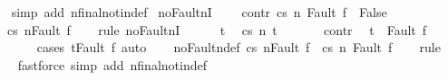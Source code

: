 \begin{isabellebody}
%
\isadelimproof
\ \ %
\endisadelimproof
%
\isatagproof
{}\isamarkupfalse%
\ {\isacharparenleft}simp\ add{\isacharcolon}\ nfinal{\isacharunderscore}notin{\isacharunderscore}def{\isacharparenright}%
\endisatagproof
{\isafoldproof}%
%
\isadelimproof
\isanewline
%
\endisadelimproof
\isanewline
{}\isamarkupfalse%
\ noFaultnI{\isacharprime}{\isacharcolon}\ \isanewline
\ \ \ contr{\isacharcolon}\ {\isachardoublequoteopen}{\isasymGamma}{\isasymturnstile}{\isasymlangle}c{\isacharcomma}s{\isasymrangle}\ {\isacharequal}n{\isasymRightarrow}\ Fault\ f\ {\isasymLongrightarrow}\ False{\isachardoublequoteclose}\isanewline
\ \ \ {\isachardoublequoteopen}{\isasymGamma}{\isasymturnstile}{\isasymlangle}c{\isacharcomma}s{\isasymrangle}\ {\isacharequal}n{\isasymRightarrow}{\isasymnotin}{\isacharbraceleft}Fault\ f{\isacharbraceright}{\isachardoublequoteclose}\isanewline
%
\isadelimproof
\ \ %
\endisadelimproof
%
\isatagproof
{}\isamarkupfalse%
\ {\isacharparenleft}rule\ noFaultnI{\isacharparenright}\isanewline
\ \ \ \ \isamarkupfalse%
\ t\ \isamarkupfalse%
\ {\isachardoublequoteopen}{\isasymGamma}{\isasymturnstile}{\isasymlangle}c{\isacharcomma}s{\isasymrangle}\ {\isacharequal}n{\isasymRightarrow}\ t{\isachardoublequoteclose}\ \isanewline
\ \ \ \ \isamarkupfalse%
\ contr\ \isamarkupfalse%
\ {\isachardoublequoteopen}t\ {\isasymnoteq}\ Fault\ f{\isachardoublequoteclose}\isanewline
\ \ \ \ \ \ \isamarkupfalse%
\ {\isacharparenleft}cases\ {\isachardoublequoteopen}t{\isacharequal}Fault\ f{\isachardoublequoteclose}{\isacharparenright}\ auto\isanewline
\ \ \isamarkupfalse%
%
\endisatagproof
{\isafoldproof}%
%
\isadelimproof
\isanewline
%
\endisadelimproof
\isanewline
{}\isamarkupfalse%
\ noFaultn{\isacharunderscore}def{\isacharprime}{\isacharcolon}\ {\isachardoublequoteopen}{\isasymGamma}{\isasymturnstile}{\isasymlangle}c{\isacharcomma}s{\isasymrangle}\ {\isacharequal}n{\isasymRightarrow}{\isasymnotin}{\isacharbraceleft}Fault\ f{\isacharbraceright}\ {\isacharequal}\ {\isacharparenleft}{\isasymnot}{\isasymGamma}{\isasymturnstile}{\isasymlangle}c{\isacharcomma}s{\isasymrangle}\ {\isacharequal}n{\isasymRightarrow}\ Fault\ f{\isacharparenright}{\isachardoublequoteclose}\isanewline
%
\isadelimproof
\ \ %
\endisadelimproof
%
\isatagproof
{}\isamarkupfalse%
\ rule\isanewline
\ \ \isamarkupfalse%
\ \ {\isacharparenleft}fastforce\ simp\ add{\isacharcolon}\ nfinal{\isacharunderscore}notin{\isacharunderscore}def{\isacharparenright}\isanewline

\end{isabellebody}
